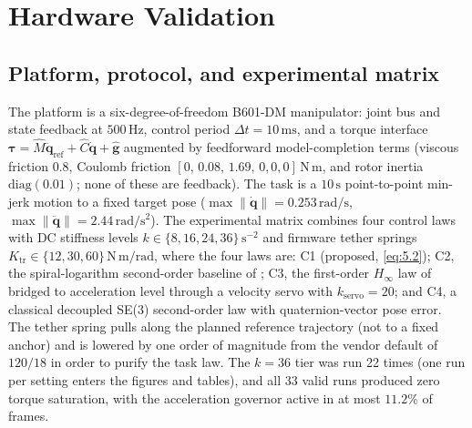 \section{Hardware Validation}\label{sec:hardware}

\subsection{Platform, protocol, and experimental matrix}

The platform is a six-degree-of-freedom B601-DM manipulator: joint bus and state feedback at $500\,\mathrm{Hz}$, control period $\Delta t=10\,\mathrm{ms}$, and a torque interface $\boldsymbol\tau=\hat M\ddot{\boldsymbol q}_{\mathrm{ref}}+\hat C\dot{\boldsymbol q}+\hat{\boldsymbol g}$ augmented by feedforward model-completion terms (viscous friction $0.8$, Coulomb friction $[0,\,0.08,\,1.69,\,0,0,0]\,\mathrm{N\,m}$, and rotor inertia $\mathrm{diag}(0.01)$; none of these are feedback). The task is a $10\,\mathrm{s}$ point-to-point min-jerk motion to a fixed target pose ($\max\|\dot{\boldsymbol q}\|=0.253\,\mathrm{rad/s}$, $\max\|\ddot{\boldsymbol q}\|=2.44\,\mathrm{rad/s^2}$). The experimental matrix combines four control laws with DC stiffness levels $k\in\{8,16,24,36\}\,\mathrm{s^{-2}}$ and firmware tether springs $K_{\mathrm{tr}}\in\{12,30,60\}\,\mathrm{N\,m/rad}$, where the four laws are: C1 (proposed, \eqref{eq:5.2}); C2, the spiral-logarithm second-order baseline of \cite{Ch20}; C3, the first-order $H_\infty$ law of \cite{P2} bridged to acceleration level through a velocity servo with $k_{\mathrm{servo}}=20$; and C4, a classical decoupled SE(3) second-order law with quaternion-vector pose error. The tether spring pulls along the planned reference trajectory (not to a fixed anchor) and is lowered by one order of magnitude from the vendor default of $120/18$ in order to purify the task law. The $k{=}36$ tier was run 22 times (one run per setting enters the figures and tables), and all 33 valid runs produced zero torque saturation, with the acceleration governor active in at most $11.2\%$ of frames.

